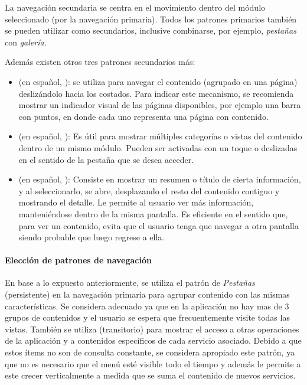La navegación secundaria se centra en el movimiento dentro del módulo seleccionado (por la navegación primaria). Todos los patrones primarios también se pueden utilizar como secundarios, inclusive combinarse, por ejemplo, \textit{pestañas} con \textit{galería}. 

Además existen otros tres patrones secundarios más\cite{neil2014mobile}:

\begin{itemize}
\item \textbf{} (en español, ): se utiliza para navegar el contenido (agrupado en una página) deslizándolo hacia los costados. Para indicar este mecanismo, se recomienda mostrar un indicador visual de las páginas disponibles, por ejemplo una barra con puntos, en donde cada uno representa una página con contenido.
\item \textbf{} (en español, ): Es útil para mostrar múltiples categorías o vistas del contenido dentro de un mismo módulo. Pueden ser activadas con un toque o deslizadas en el sentido de la pestaña que se desea acceder.
\item \textbf{} (en español, ): Consiste en mostrar un resumen o título de cierta información, y al seleccionarlo, se abre, desplazando el resto del contenido contiguo y mostrando el detalle. Le permite al usuario ver más información, manteniéndose dentro de la misma pantalla. Es eficiente en el sentido que, para ver un contenido, evita que el usuario tenga que navegar a otra pantalla siendo probable que luego regrese a ella.
\end{itemize}

\paragraph{Elección de patrones de navegación}
\label{navegacion_secundaria}

En base a lo expuesto anteriormente, se utiliza el patrón de \textit{Pestañas} (persistente) en la navegación primaria para agrupar contenido con las mismas características. Se considera adecuado ya que en la aplicación no hay mas de 3 grupos de contenidos y el usuario se espera que frecuentemente visite todas las vistas.
También se utiliza  (transitorio) para mostrar el acceso a otras operaciones de la aplicación y a contenidos específicos de cada servicio asociado. Debido a que estos ítems no son de consulta constante, se considera apropiado este patrón, ya que no es necesario que el menú esté visible todo el tiempo y además le permite a este crecer verticalmente a medida que se suma el contenido de nuevos servicios.

